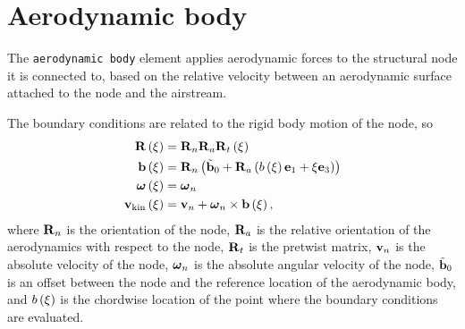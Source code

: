 \section{Aerodynamic body}
The \texttt{aerodynamic body} element applies aerodynamic forces
to the structural node it is connected to,
based on the relative velocity between an aerodynamic surface attached 
to the node and the airstream.

The boundary conditions are related to the rigid body motion
of the node, so
\begin{subequations}
\begin{align}
	\bm{\mathbf{R}}\left( \xi \right)
	&=
	\bm{\mathbf{R}}_n \bm{\mathbf{R}}_a \bm{\mathbf{R}}_t\left( \xi \right)
	\\
	\bm{\mathbf{b}}\left( \xi \right)
	&=
	\bm{\mathbf{R}}_n\left( 
		\tilde{\bm{\mathbf{b}}}_0
		+ \bm{\mathbf{R}}_a \left( 
			b\left( \xi \right) \bm{\mathbf{e}}_1
			+ \xi \bm{\mathbf{e}}_3
		 \right)
	 \right)
	\\
	\bm{\mathbf{\omega}}\left( \xi \right)
	&=
	\bm{\mathbf{\omega}}_n
	\\
	\bm{\mathbf{v}}_{\text{kin}}\left( \xi \right)
	&=
	\bm{\mathbf{v}}_n + \bm{\mathbf{\omega}}_n \times \bm{\mathbf{b}}\left( \xi \right)
	,
\end{align}
\end{subequations}
where
$\bm{\mathbf{R}}_n$ is the orientation of the node,
$\bm{\mathbf{R}}_a$ is the relative orientation of the aerodynamics
with respect to the node,
$\bm{\mathbf{R}}_t$ is the pretwist matrix,
$\bm{\mathbf{v}}_n$ is the absolute velocity of the node,
$\bm{\mathbf{\omega}}_n$ is the absolute angular velocity of the node,
$\tilde{\bm{\mathbf{b}}}_0$ is an offset between the node and the reference location
of the aerodynamic body,
and $b\left( \xi \right)$ is the chordwise location of the point
where the boundary conditions are evaluated.

